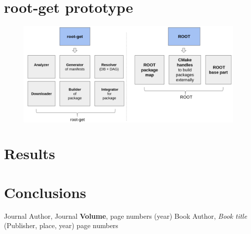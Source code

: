 \documentclass{webofc}
\begin{document}
\section{root-get prototype}

\begin{figure}
\includegraphics[width=1.0\linewidth]{picture/3.png}
\caption{}
\label{interp}
\end{figure}

\section{Results}

\section{Conclusions}

%
% 
%
%
\begin{thebibliography}{}
%
%
Journal Author, Journal \textbf{Volume}, page numbers (year)
Book Author, \textit{Book title} (Publisher, place, year) page numbers
\end{thebibliography}
\end{document}
